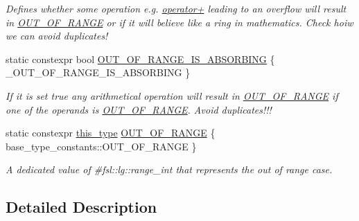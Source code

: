 \begin{DoxyCompactItemize}
\begin{DoxyCompactList}\small\item\em Defines whether some operation e.\+g. \mbox{\hyperlink{classfsl_1_1ver1__0_1_1lg_1_1range__int_aa2c1e9553dae1b9858d307b6faaee489}{operator+}} leading to an overflow will result in \mbox{\hyperlink{classfsl_1_1ver1__0_1_1lg_1_1range__int_a690eec0614992c007017ea852bb58210}{O\+U\+T\+\_\+\+O\+F\+\_\+\+R\+A\+N\+GE}} or if it will believe like a ring in mathematics. Check hoiw we can avoid duplicates! \end{DoxyCompactList}\item 
\mbox{\label{classfsl_1_1ver1__0_1_1lg_1_1range__int_a4e1d255d6ab0a61338a9c75e220f9308}} 
static constexpr bool \mbox{\hyperlink{classfsl_1_1ver1__0_1_1lg_1_1range__int_a4e1d255d6ab0a61338a9c75e220f9308}{O\+U\+T\+\_\+\+O\+F\+\_\+\+R\+A\+N\+G\+E\+\_\+\+I\+S\+\_\+\+A\+B\+S\+O\+R\+B\+I\+NG}} \{ \+\_\+\+O\+U\+T\+\_\+\+O\+F\+\_\+\+R\+A\+N\+G\+E\+\_\+\+I\+S\+\_\+\+A\+B\+S\+O\+R\+B\+I\+NG \}
\begin{DoxyCompactList}\small\item\em If it is set true any arithmetical operation will result in \mbox{\hyperlink{classfsl_1_1ver1__0_1_1lg_1_1range__int_a690eec0614992c007017ea852bb58210}{O\+U\+T\+\_\+\+O\+F\+\_\+\+R\+A\+N\+GE}} if one of the operands is \mbox{\hyperlink{classfsl_1_1ver1__0_1_1lg_1_1range__int_a690eec0614992c007017ea852bb58210}{O\+U\+T\+\_\+\+O\+F\+\_\+\+R\+A\+N\+GE}}. Avoid duplicates!!! \end{DoxyCompactList}\item 
\mbox{\label{classfsl_1_1ver1__0_1_1lg_1_1range__int_a690eec0614992c007017ea852bb58210}} 
static constexpr \mbox{\hyperlink{classfsl_1_1ver1__0_1_1lg_1_1range__int_a0ee4e72fddcd213f9c0440f3824544c1}{this\+\_\+type}} \mbox{\hyperlink{classfsl_1_1ver1__0_1_1lg_1_1range__int_a690eec0614992c007017ea852bb58210}{O\+U\+T\+\_\+\+O\+F\+\_\+\+R\+A\+N\+GE}} \{ base\+\_\+type\+\_\+constants\+::\+O\+U\+T\+\_\+\+O\+F\+\_\+\+R\+A\+N\+GE \}
\begin{DoxyCompactList}\small\item\em A dedicated value of \#fsl\+::lg\+::range\+\_\+int that represents the out of range case. \end{DoxyCompactList}\end{DoxyCompactItemize}


\subsection{Detailed Description}
